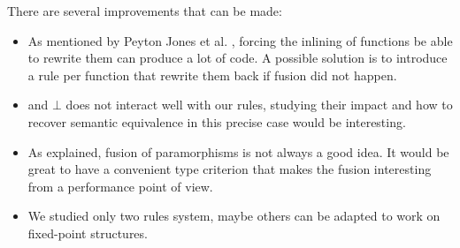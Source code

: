 
There are several improvements that can be made:
\begin{itemize}
\item As mentioned by Peyton Jones et al. \cite{pbr}, forcing the inlining of functions be able to rewrite them can produce a lot of code. A possible solution is to introduce a rule per function that rewrite them back if fusion did not happen.
\item {} and $\bot$ does not interact well with our rules, studying their impact and how to recover semantic equivalence in this precise case would be interesting.
\item As explained, fusion of paramorphisms is not always a good idea. It would be great to have a convenient type criterion that makes the fusion interesting from a performance point of view.
\item We studied only two rules system, maybe others can be adapted to work on fixed-point structures.
\end{itemize}